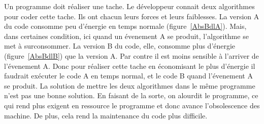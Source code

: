 \documentclass[a4paper, 11pt]{report}
\begin{document}
Un programme doit réaliser une tache. Le développeur connait deux algorithmes pour coder cette tache. Ils ont chacun leurs forces et leurs faiblesses. La version A du code consomme peu d'énergie en temps normale (figure~\ref{AbsBdlA}). Mais, dans certaines condition, ici quand un évenement A se produit, l'algorithme se met à surconsommer. La version B du code, elle, consomme plus d'énergie (figure~\ref{AbsBdlB}) que la version A. Par contre il est moins sensible à l'arriver de l'évenement A. Donc pour réaliser cette tache en économisant le plus d'énergie il faudrait exécuter le code A en temps normal, et le code B quand l'évenement A se produit. La solution de mettre les deux algorithmes dans le même programme n'est pas une bonne solution. En faisant de la sorte, on alourdit le programme, ce qui rend plus exigent en ressource le programme et donc avance l'obsolescence des machine. De plus, cela rend la maintenance du code plus difficile.
\end{document}
